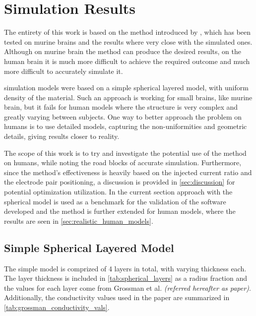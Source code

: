 \pagebreak
\chapter{Simulation Results}

The entirety of this work is based on the method introduced by , which has been tested on murine brains and the results where very close with the simulated ones. Although on murine brain the method can produce the desired results, on the human brain it is much more difficult to achieve the required outcome and much more difficult to accurately simulate it.

 simulation models were based on a simple spherical layered model, with uniform density of the material. Such an approach is working for small brains, like murine brain, but it fails for human models where the structure is very complex and greatly varying between subjects. One way to better approach the problem on humans is to use detailed models, capturing the non-uniformities and geometric details, giving results closer to reality.

The scope of this work is to try and investigate the potential use of the  method on humans, while noting the road blocks of accurate simulation. Furthermore, since the method's effectiveness is heavily based on the injected current ratio and the electrode pair positioning, a discussion is provided in \autoref{sec:discussion} for potential optimization utilization. In the current section  approach with the spherical model is used as a benchmark for the validation of the software developed and the method is further extended for human models, where the results are seen in \autoref{sec:realistic_human_models}.

\section{Simple Spherical Layered Model}

The simple model is comprized of 4 layers in total, with varying thickness each. The layer thickness is included in \autoref{tab:spherical_layers} as a radius fraction and the values for each layer come from Grossman et al. \cite[Figure S2, J and K]{Grossman2017} \textit{(referred hereafter as paper)}. Additionally, the conductivity values used in the paper are summarized in \autoref{tab:grossman_conductivity_vals}.

